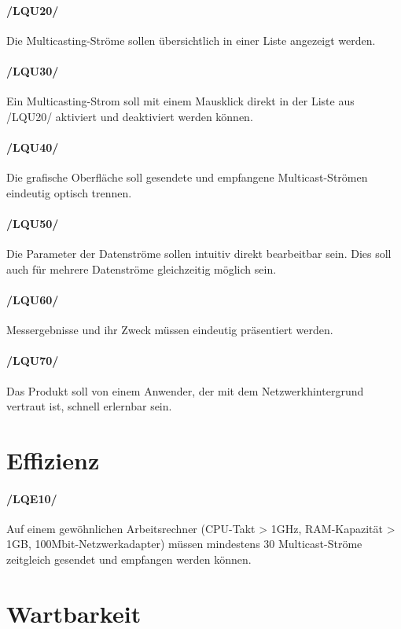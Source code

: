 \paragraph{/LQU20/} Die Multicasting-Ströme sollen übersichtlich in einer Liste
angezeigt werden.

\paragraph{/LQU30/} Ein Multicasting-Strom soll mit einem Mausklick direkt in
der Liste aus /LQU20/ aktiviert und deaktiviert werden können.

\paragraph{/LQU40/} Die grafische Oberfläche soll gesendete
und empfangene Multicast-Strömen eindeutig optisch trennen.

\paragraph{/LQU50/} Die Parameter der Datenströme sollen intuitiv direkt
bearbeitbar sein. Dies soll auch für mehrere Datenströme gleichzeitig möglich
sein.

\paragraph{/LQU60/} Messergebnisse und ihr Zweck müssen eindeutig präsentiert
werden.

\paragraph{/LQU70/} Das Produkt soll von einem Anwender, der mit dem
Netzwerkhintergrund vertraut ist, schnell erlernbar sein.

\section{Effizienz}

\paragraph{/LQE10/} Auf einem gewöhnlichen Arbeitsrechner (CPU-Takt > 1GHz,
RAM-Kapazität > 1GB, 100Mbit-Netzwerkadapter) müssen mindestens 30
Multicast-Ströme zeitgleich gesendet und empfangen werden können.

\section{Wartbarkeit}

